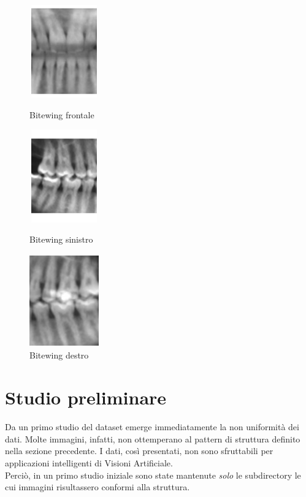 \documentclass[12pt,a4paper,openright,twoside]{book}
\begin{document}
\begin{figure}[H]
    \centering
    \begin{minipage}{0.3\textwidth}
	\centering
    	\includegraphics[height=4cm,width=3cm]{figures/FRONTAL.pdf}
    	\caption{Bitewing frontale}
    	\label{lab:Bitewing frontale}
    \end{minipage}\hfill
    \begin{minipage}{0.3\textwidth}
    	\centering
    	\includegraphics[height=4cm,width=3cm]{figures/BTWSX.pdf}
    	\caption{Bitewing sinistro}
    	\label{lab:Bitewing sinistro}
    \end{minipage}\hfill
    \begin{minipage}{0.3\textwidth}
    	\centering
    	\includegraphics[height=4cm,width=3cm]{figures/BTWDX.pdf}
    	\caption{Bitewing destro}
   	\label{lab:Bitewing destro}
    \end{minipage}
\end{figure}

\section{Studio preliminare}
Da un primo studio del dataset emerge immediatamente la non uniformità dei dati. Molte immagini, infatti, non ottemperano al pattern di struttura definito nella sezione precedente. I dati, così presentati, non sono sfruttabili per applicazioni intelligenti di Visioni Artificiale.\\
Perciò, in un primo studio iniziale sono state mantenute {\itshape solo} le subdirectory le cui immagini risultassero conformi alla struttura.\\
\end{document}
